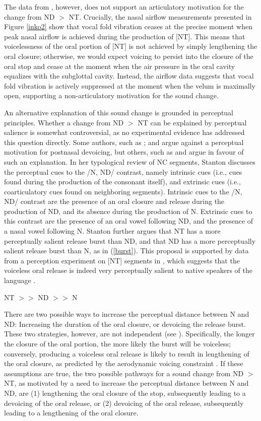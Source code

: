 \documentclass[output=paper,hidelinks]{langscibook}
\begin{document}
The data from , however, does not support an articulatory motivation for the change from ND $>$ NT. Crucially, the nasal airflow measurements presented in Figure \ref{inko2} show that vocal fold vibration ceases at the precise moment when peak nasal airflow is achieved during the production of [NT]. This means that voicelessness of the oral portion of [NT] is not achieved by simply lengthening the oral closure; otherwise, we would expect voicing to persist into the closure of the oral stop and cease at the moment when the air pressure in the oral cavity equalizes with the subglottal cavity. Instead, the airflow data suggests that vocal fold vibration is actively suppressed at the moment when the velum is maximally open, supporting a non-articulatory motivation for the sound change.

An alternative explanation of this sound change is grounded in perceptual principles. Whether a change from ND $>$ NT can be explained by perceptual salience is somewhat controversial, as no experimental evidence has addressed this question directly. Some authors, such as \citet{Hyman2001}; and \citet{Begus2019} argue against a perceptual motivation for postnasal devoicing, but others, such as \citet{Kirchner2000} and \citet{stanton2017} argue in favour of such an explanation. In her typological review of NC segments, Stanton discusses the perceptual cues to the /N, ND/ contrast, namely intrinsic cues (i.e., cues found during the production of the consonant itself), and extrinsic cues (i.e., coarticulatory cues found on neighboring segments). Intrinsic cues to the /N, ND/ contrast are the presence of an oral closure and release during the production of ND, and its absence during the production of N. Extrinsic cues to this contrast are the presence of an oral vowel following ND, and the presence of a nasal vowel following N. Stanton further argues that NT has a more perceptually salient release burst than ND, and that ND has a more perceptually salient release burst than N, as in (\ref{burst}). This proposal is supported by data from a perception experiment on [NT] segments in , which suggests that the voiceless oral release is indeed very perceptually salient to native speakers of the language \citep[]{LapierreLin2019}.

\ea\label{burst} NT $>>$ ND $>>$ N \z

There are two possible ways to increase the perceptual distance between N and ND: Increasing the duration of the oral closure, or devoicing the release burst. These two strategies, however, are not independent (see ). Specifically, the longer the closure of the oral portion, the more likely the burst will be voiceless; conversely, producing a voiceless oral release is likely to result in lengthening of the oral closure, as predicted by the aerodynamic voicing constraint \citep{Ohala1983, Ohala2011}. If these assumptions are true, the two possible pathways for a sound change from ND $>$ NT, as motivated by a need to increase the perceptual distance between N and ND, are (1) lengthening the oral closure of the stop, subsequently leading to a devoicing of the oral release, or (2) devoicing of the oral release, subsequently leading to a lengthening of the oral closure.
\end{document}

